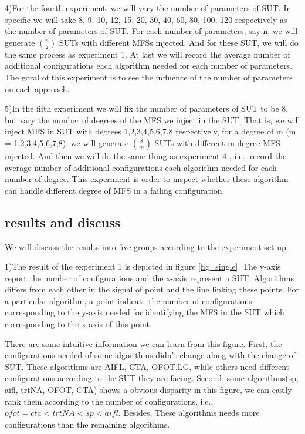 \documentclass[10pt,journal,cspaper,compsoc]{IEEEtran}
\begin{document}
4)For the fourth experiment, we will vary the number of parameters of SUT. In specific we will take 8, 9, 10, 12, 15, 20, 30, 40, 60, 80, 100, 120 respectively as the number of parameters of SUT. For each number of parameters, say n, we will generate $\binom{n}{2}$ SUTs with different MFSs injected. And for these SUT, we will do the same process as experiment 1. At last we will record the average number of additional configurations each algorithm needed for each number of parameters. The goral of this experiment is to see the influence of the number of parameters on each approach.

5)In the fifth experiment we will fix the number of parameters of SUT to be 8, but vary the number of degrees of the MFS we inject in the SUT. That is, we will inject MFS in SUT with degrees 1,2,3,4,5,6,7,8 respectively, for a degree of m (m = 1,2,3,4,5,6,7,8), we will generate $\binom{8}{m}$ SUTs with different m-degree MFS injected. And then we will do the same thing as experiment 4 , i.e., record the average number of additional configurations each algorithm needed for each number of degree. This experiment is order to inspect whether these algorithm can handle different degree of MFS in a failing configuration.

\subsection{results and discuss}
We will discuss the results into five groups according to the experiment set up.

1)The result of the experiment 1 is depicted in figure \ref{fig_single}. The y-axis report the number of configurations and the x-axis represent a SUT. Algorithms differs from each other in the signal of point and the line linking these points. For a particular algorithm, a point indicate the number of configurations corresponding to the y-axis needed for identifying the MFS in the SUT which corresponding to the x-axis of this point.

There are some intuitive information we can learn from this figure. First, the configurations needed of some algorithms didn't change along with the change of SUT. These algorithms are AIFL, CTA, OFOT,LG, while others need different configurations according to the SUT they are facing. Second, some algorithms(sp, aifl, trtNA, OFOT, CTA) shows a obvious disparity in this figure, we can easily rank them according to the number of configurations, i.e., $ofot = cta < trtNA < sp< aifl $. Besides, These algorithms needs more configurations than the remaining algorithms.
\end{document}
